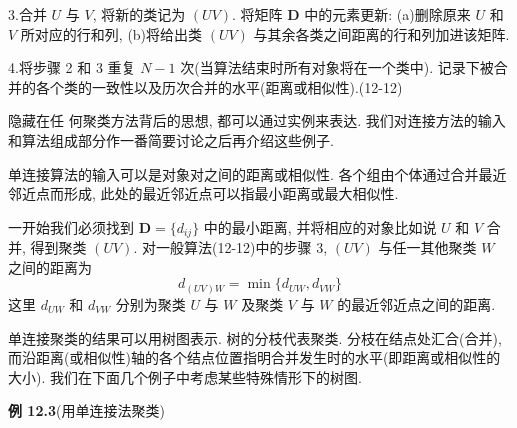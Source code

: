 
3.\quad 合并 $U$ 与 $V$, 将新的类记为 $(UV)$. 将矩阵 $\mathbf{D}$ 中的元素更新: (a)删除原来 $U$ 和 $V$ 所对应的行和列, (b)将给出类 $(UV)$ 与其余各类之间距离的行和列加进该矩阵.

4.\quad 将步骤 2 和 3 重复 $N-1$ 次(当算法结束时所有对象将在一个类中). 记录下被合并的各个类的一致性以及历次合并的水平(距离或相似性).\hfill(12-12)

隐藏在任 何聚类方法背后的思想, 都可以通过实例来表达. 我们对连接方法的输入和算法组成部分作一番简要讨论之后再介绍这些例子.


单连接算法的输入可以是对象对之间的距离或相似性. 各个组由个体通过合并最近邻近点而形成, 此处的最近邻近点可以指最小距离或最大相似性.

一开始我们必须找到 $\mathbf{D}=\{d_{ij}\}$ 中的最小距离, 并将相应的对象比如说 $U$ 和 $V$ 合并, 得到聚类 $(UV)$. 对一般算法(12-12)中的步骤 3, $(UV)$ 与任一其他聚类 $W$ 之间的距离为
\label{eq:12-13}
\begin{equation}
d_{(UV)W}=\min\{d_{UW},d_{VW}\}
\tag{12-13}
\end{equation}
这里 $d_{UW}$ 和 $d_{VW}$ 分别为聚类 $U$ 与 $W$ 及聚类 $V$ 与 $W$ 的最近邻近点之间的距离.

单连接聚类的结果可以用树图表示. 树的分枝代表聚类. 分枝在结点处汇合(合并), 而沿距离(或相似性)轴的各个结点位置指明合并发生时的水平(即距离或相似性的大小). 我们在下面几个例子中考虑某些特殊情形下的树图.

\noindent\textbf{例 12.3}\quad (用单连接法聚类)

